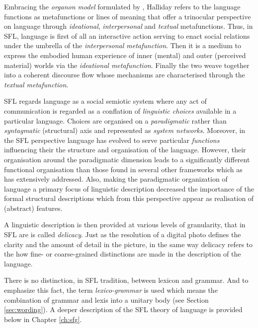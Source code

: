 
Embracing the \textit{organon model} formulated by \citet{Buhler34}, Halliday refers to the language functions as metafunctions or lines of meaning that offer a trinocular perspective on language through \textit{ideational}, \textit{interpersonal} and \textit{textual} metafunctions. Thus, in SFL, language is first of all an interactive action serving to enact social relations under the umbrella of the \textit{interpersonal metafunction}. Then it is a medium to express the embodied human experience of inner (mental) and outer (perceived material) worlds via the \textit{ideational metafunction}. Finally the two weave together into a coherent discourse flow whose mechanisms are characterised through the \textit{textual metafunction}. 

SFL regards language as a social semiotic system where any act of communication is regarded as a conflation of \textit{linguistic choices} available in a particular language. Choices are organised on a \textit{paradigmatic} rather than \textit{syntagmatic} (structural) axis and represented as \textit{system networks}. Moreover, in the SFL perspective language has evolved to serve particular \textit{functions} influencing their the structure and organisation of the language. However, their organisation around the paradigmatic dimension leads to a significantly different functional organisation than those found in several other frameworks which as \citet{Butler2003-pt1, Butler2003-pt2} has extensively addressed. 
Also, making the paradigmatic organization of language a primary focus of linguistic description decreased the importance of the formal structural descriptions which from this perspective appear as realisation of (abstract) features. 

A linguistic description is then provided at various levels of granularity, that in SFL are is called \textit{delicacy}. Just as the resolution of a digital photo defines the clarity and the amount of detail in the picture, in the same way delicacy refers to the how fine- or coarse-grained distinctions are made in the description of the language. 

There is no distinction, in SFL tradition, between lexicon and grammar. And to emphasize this fact, the term \textit{lexico-grammar} is used which means the combination of grammar and lexis into a unitary body (see Section \ref{sec:wording}). %
A deeper description of the SFL theory of language is provided below in Chapter \ref{ch:sfg}.

